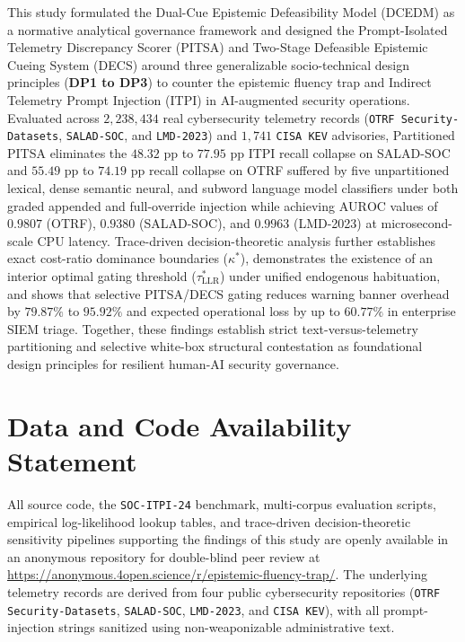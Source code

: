\documentclass[11pt,a4paper]{article}
\let\oldtexttt\texttt
\renewcommand{\texttt}[1]{\textnormal{\oldtexttt{#1}}}
\begin{document}
This study formulated the Dual-Cue Epistemic Defeasibility Model (DCEDM) as a normative analytical governance framework and designed the Prompt-Isolated Telemetry Discrepancy Scorer (PITSA) and Two-Stage Defeasible Epistemic Cueing System (DECS) around three generalizable socio-technical design principles (\textbf{DP1 to DP3}) to counter the epistemic fluency trap and Indirect Telemetry Prompt Injection (ITPI) in AI-augmented security operations. Evaluated across $2,238,434$ real cybersecurity telemetry records (\texttt{OTRF Security-Datasets}, \texttt{SALAD-SOC}, and \texttt{LMD-2023}) and $1,741$ \texttt{CISA KEV} advisories, Partitioned PITSA eliminates the $48.32\text{ pp}$ to $77.95\text{ pp}$ ITPI recall collapse on SALAD-SOC and $55.49\text{ pp}$ to $74.19\text{ pp}$ recall collapse on OTRF suffered by five unpartitioned lexical, dense semantic neural, and subword language model classifiers under both graded appended and full-override injection while achieving $\text{AUROC}$ values of $0.9807$ (OTRF), $0.9380$ (SALAD-SOC), and $0.9963$ (LMD-2023) at microsecond-scale CPU latency. Trace-driven decision-theoretic analysis further establishes exact cost-ratio dominance boundaries ($\kappa^*$), demonstrates the existence of an interior optimal gating threshold ($\tau^*_{\text{LLR}}$) under unified endogenous habituation, and shows that selective PITSA/DECS gating reduces warning banner overhead by $79.87\%$ to $95.92\%$ and expected operational loss by up to $60.77\%$ in enterprise SIEM triage. Together, these findings establish strict text-versus-telemetry partitioning and selective white-box structural contestation as foundational design principles for resilient human-AI security governance.

\FloatBarrier
\section*{Data and Code Availability Statement}
All source code, the \texttt{SOC-ITPI-24} benchmark, multi-corpus evaluation scripts, empirical log-likelihood lookup tables, and trace-driven decision-theoretic sensitivity pipelines supporting the findings of this study are openly available in an anonymous repository for double-blind peer review at \url{https://anonymous.4open.science/r/epistemic-fluency-trap/}. The underlying telemetry records are derived from four public cybersecurity repositories (\texttt{OTRF Security-Datasets}, \texttt{SALAD-SOC}, \texttt{LMD-2023}, and \texttt{CISA KEV}), with all prompt-injection strings sanitized using non-weaponizable administrative text.
\end{document}
